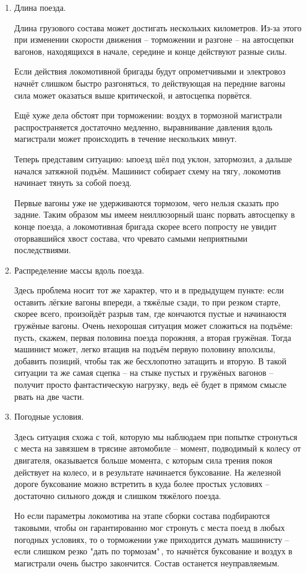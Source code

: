 \begin{enumerate}
\item Длина поезда.

Длина грузового состава может достигать нескольких километров. Из-за этого при изменении скорости движения -- торможении и разгоне -- на автосцепки вагонов, находящихся в начале, середине и конце действуют разные силы.

Если действия локомотивной бригады будут опрометчивыми и электровоз начнёт слишком быстро разгоняться, то действующая на передние вагоны сила может оказаться выше критической, и автосцепка порвётся.

Ещё хуже дела обстоят при торможении: воздух в тормозной магистрали распространяется достаточно медленно, выравнивание давления вдоль магистрали может происходить в течение нескольких минут. 

Теперь представим ситуацию: ыпоезд шёл под уклон, затормозил, а дальше начался затяжной подъём. Машинист собирает схему на тягу, локомотив начинает тянуть за собой поезд.

Первые вагоны уже не удерживаются тормозом, чего нельзя сказать про задние. Таким образом мы имеем неиллюзорный шанс порвать автосцепку в конце поезда, а локомотивная бригада скорее всего  попросту не увидит оторвавшийся хвост состава, что чревато самыми неприятными последствиями.

\item Распределение массы вдоль поезда.

Здесь проблема носит тот же характер, что и в предыдущем пункте: если оставить лёгкие вагоны впереди, а тяжёлые сзади, то при резком старте, скорее всего, произойдёт разрыв там, где кончаются пустые и начинаюстя гружёные вагоны. Очень нехорошая ситуация может сложиться на подъёме: пусть, скажем, первая половина поезда порожняя, а вторая гружёная. Тогда машинист может, легко втащив на подъём первую половину вполсилы, добавить позиций, чтобы так же бесхлопотно затащить и вторую. В такой ситуации та же самая сцепка -- на стыке пустых и гружёных вагонов -- получит просто фантастическую нагрузку, ведь её будет в прямом смысле рвать на две части.

\item Погодные условия.

Здесь ситуация схожа с той, которую мы наблюдаем при попытке стронуться с места на завязшем в трясине автомобиле -- момент, подводимый к колесу от двигателя, оказывается больше момента, с которым сила трения покоя действует на колесо, и в результате начинается буксование. На железной дороге буксование можно встретить в куда более простых условиях -- достаточно сильного дождя и слишком тяжёлого поезда.

Но если параметры локомотива на этапе сборки состава подбираются таковыми, чтобы он гарантированно мог стронуть с места поезд в любых погодных условиях, то о торможении уже приходится думать машинисту -- если слишком резко "дать по тормозам"\,, то начнётся буксование и воздух в магистрали очень быстро закончится. Состав останется неуправляемым.
\end{enumerate}

